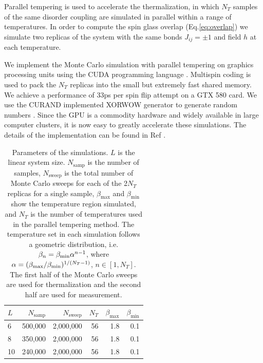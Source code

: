 \documentclass[aps,prb,twocolumn,showpacs,superscriptaddress]{revtex4}
\begin{document}
Parallel tempering\cite{Hukushima-Nemoto1996,Marinari-Parisi1992} is used to accelerate the thermalization, 
in which $N_T$ samples of the same disorder coupling are simulated in parallel within a range 
of temperatures. In order to compute 
the spin glass overlap (Eq.\ref{eq:overlap}) we simulate two replicas 
of the system with the same bonds $J_{ij}=\pm 1$ and field $h$ at each temperature. 

We implement the Monte Carlo simulation with parallel tempering on graphics 
processing units using the CUDA programming language \cite{Nickolls:2008:SPP:1365490.1365500}. 
Multispin coding\cite{PhysRevLett.42.1390,Zorn1981337} is used 
to pack the $N_T$ replicas into the small but extremely fast shared 
memory. We achieve a performance of 33ps per spin flip attempt on a GTX 580 card.
We use the CURAND implemented XORWOW generator to generate random numbers \cite{curand}.
Since the GPU is a commodity hardware and widely available in large
computer clusters, it is now easy to greatly accelerate these 
simulations. 
The details of the implementation can be found in 
Ref . 


\begin{table}[ht]
  \centering
  \caption{Parameters of the simulations.  $L$ is the linear system size.
$N_{\mathrm{samp}}$ is the number of samples, 
$N_{\mathrm{sweep}}$ is the total number of Monte Carlo sweeps for each of the 2$N_T$ replicas 
for a single sample, $\beta_{\mathrm{max}}$ and $\beta_{\mathrm{min}}$ show the temperature 
region simulated, and $N_T$ is the number of temperatures used in the parallel tempering method. 
The temperature set in each simulation follows a geometric distribution, 
i.e. $\beta_n=\beta_{\rm min}\alpha^{n-1}$, where $\alpha=(\beta_{\rm max}/\beta_{\rm min})^{1/(N_T-1)}$, $n\in [1,N_T]$.
The first half of the Monte Carlo sweeps are used for thermalization and the second half are used for measurement.}
 \begin{ruledtabular}
 \begin{tabular}{lrrrrr}
    $L$&$N_{\mathrm{samp}}$&$N_{\mathrm{sweep}}$& $N_T$  &$\beta_{\mathrm{max}}$ &  $\beta_{\mathrm{min}}$  \\
\hline
6&500,000&2,000,000&56&1.8&0.1\\
8&350,000&2,000,000&56&1.8&0.1\\
10&240,000&2,000,000&56&1.8&0.1\\
  \end{tabular}
\end{ruledtabular}
  \label{tab:parameters}
\end{table}
\end{document}
